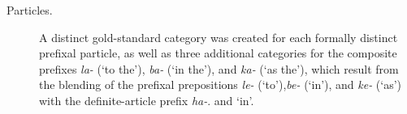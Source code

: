 \begin{description}


\item[Particles.]
A distinct gold-standard category was created for each formally distinct prefixal particle, as well as three additional categories for the composite
prefixes \textit{la-} (`to the'), \textit{ba-} (`in the'), and \textit{ka-} (`as the'), which result from the blending of the prefixal prepositions \textit{le-} (`to'),\textit{be-} (`in'), and \textit{ke-} (`as') with the definite-article prefix \textit{ha-}.
and  `in'. 


\end{description}
